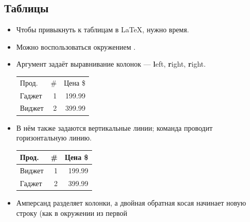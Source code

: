 \documentclass{beamer}
\begin{document}
\subsection{Таблицы}

\begin{frame}[fragile]{\insertsubsection}
\vspace{-3ex}
\begin{itemize}\small
\item Чтобы привыкнуть к таблицам в \LaTeX{}, нужно время.
\item Можно воспользоваться окружением .
\item Аргумент задаёт выравнивание колонок --- \textbf{l}eft, \textbf{r}ight, \textbf{r}ight.
\begin{exampletwouptiny}
\begin{tabular}{lrr}
Прод.  & \# & Цена \$ \\
Гаджет & 1  & 199.99  \\
Виджет & 2  & 399.99  \\
\end{tabular}
\end{exampletwouptiny}
\vspace{-1ex}
\item В нём также задаются вертикальные линии; команда  проводит горизонтальную линию.
\begin{exampletwouptiny}
\begin{tabular}{|l|r|r|} \hline
Прод.  & \# & Цена \$ \\\hline
Виджет & 1  & 199.99  \\
Гаджет & 2  & 399.99  \\\hline
\end{tabular}
\end{exampletwouptiny}
\item Амперсанд \keystrokebftt{\&} разделяет колонки, а двойная обратная косая
  \keystrokebftt{\bs}\keystrokebftt{\bs} начинает новую строку (как в окружении
   из первой 
\end{itemize}
\end{frame}

\end{document}

